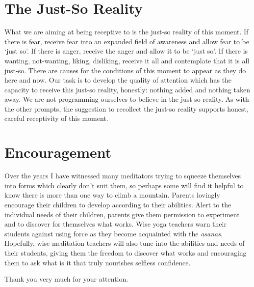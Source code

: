 \section{The Just-So Reality}

What we are aiming at being receptive to is the just-so reality of this moment.
If there is fear, receive fear into an expanded field of awareness and
allow fear to be `just so'. If there is anger, receive the anger and
allow it to be `just so'. If there is wanting, not-wanting, liking,
disliking, receive it all and contemplate that it is all just-so. There are
causes for the conditions of this moment to appear as they do here and
now. Our task is to develop the quality of attention which has the capacity to
receive this just-so reality, honestly: nothing added and nothing taken
away. We are not programming ourselves to believe in the just-so
reality. As with the other prompts, the suggestion to recollect the
just-so reality supports honest, careful receptivity of this moment.

\sectionBreak

\section{Encouragement}

Over the years I have witnessed many meditators trying to squeeze
themselves into forms which clearly don't suit them, so perhaps some
will find it helpful to know there is more than one way to climb a
mountain. Parents lovingly encourage their children to develop according
to their abilities. Alert to the individual needs of their children,
parents give them permission to experiment and to discover for
themselves what works. Wise yoga teachers warn their students against
using force as they become acquainted with the \emph{asanas}. Hopefully,
wise meditation teachers will also tune into the abilities and needs of
their students, giving them the freedom to discover what works and
encouraging them to ask what is it that truly nourishes selfless
confidence.

Thank you very much for your attention.

